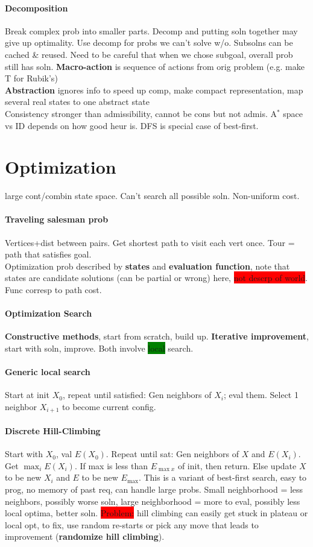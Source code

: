 \paragraph{Decomposition} Break complex prob into smaller
parts. Decomp and putting soln together may give up optimality. Use
decomp for probs we can't solve w/o. Subsolns can be cached \&
reused. Need to be careful that when we chose subgoal, overall prob
still has soln. \textbf{Macro-action} is sequence of actions from orig problem
(e.g. make T for Rubik's)
\\ \textbf{Abstraction} ignores info to speed up comp, make compact
representation, map several real states to one abstract state
\\ Consistency stronger than admissibility, cannot be cons but not
admis. A$^*$ space vs ID depends on how good heur is. DFS is special
case of best-first.
\color[HTML]{008080}
\section{\textcolor[HTML]{008080}{Optimization}}
large cont/combin state space. Can't search all
possible soln. Non-uniform cost.
\paragraph{Traveling salesman prob} Vertices+dist between pairs. Get
shortest path to visit each vert once. Tour = path that satisfies
goal.
\\ Optimization prob described by \textbf{states} and
\textbf{evaluation function}, note that states are candidate solutions
(can be partial or wrong)
here, \colorbox{red}{not descrp of world}. Func corresp to
path cost.
\paragraph{Optimization Search}
\textbf{Constructive methods}, start from scratch, build
up. \textbf{Iterative improvement}, start with soln, improve. Both
involve \colorbox{green}{local} search.
\paragraph{Generic local search}
Start at init $X_0$, repeat until satisfied: Gen neighbors of $X_i$;
eval them. Select 1 neighbor $X_{i+1}$ to become current
config.
\paragraph{Discrete Hill-Climbing}Start with $X_0$, val
$E(X_0)$. Repeat until sat: Gen
neighbors of $X$ and $E(X_i)$. Get $\max_i E(X_i)$. If max is
less than $E_{\max x}$ of init, then return. Else update $X$ to be new $X_i$
and $E$ to be new $E_{\max}$. This is a variant of best-first search,
easy to prog, no memory of past req, can handle large probs. Small
neighborhood = less neighbors, possibly worse soln, large
neighborhood = more to eval, possibly less local optima, better
soln. \colorbox{red}{Problem:} hill climbing can easily get stuck in
plateau or local opt, to fix, use random re-starts or pick any move
that leads to improvement (\textbf{randomize hill climbing}).
